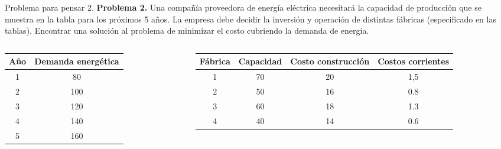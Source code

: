 \documentclass{beamer}
\begin{document}
\begin{frame}[fragile]{Problema para pensar 2.}
  \textbf{Problema 2.}
  Una compañía proveedora de energía eléctrica necesitará la capacidad de producción que se muestra en la tabla para los próximos 5 años.
  La empresa debe decidir la inversión y operación de distintas fábricas (especificado en las tablas).
  Encontrar una solución al problema de minimizar el costo cubriendo la demanda de energía.
  \begin{columns}
    \begin{column}{0.3 \textwidth}
      \begin{center}
        \begin{adjustbox}{width = 1.10 \textwidth}
            \begin{tabular}{|c|c|}
              \hline
              Año & Demanda energética \\ 
              \hline 
              1 & 80 \\
              2 & 100 \\
              3 & 120 \\
              4 & 140 \\
              5 & 160 \\
              \hline
            \end{tabular}
        \end{adjustbox}
      \end{center}
    \end{column}
    \begin{column}{0.7 \textwidth}
      \begin{center}
        \begin{adjustbox}{width = 1.08 \textwidth}
            \begin{tabular}{|c|c|c|c|}
              \hline
              Fábrica & Capacidad & Costo construcción & Costos corrientes    \\
              \hline
              1 & 70 & 20 & 1,5 \\
              2 & 50 & 16 & 0.8 \\
              3 & 60 & 18 & 1.3 \\ 
              4 & 40 & 14 & 0.6 \\
              \hline
            \end{tabular}
        \end{adjustbox}
      \end{center}
    \end{column}
  \end{columns}
\end{frame}
\end{document}
